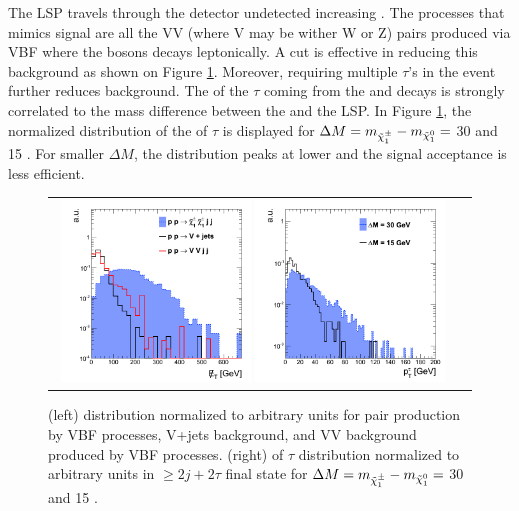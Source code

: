The \neutralinoone LSP travels through the detector undetected increasing \met. The processes that mimics signal are all the VV (where V may be wither W or Z) pairs produced via VBF where the bosons decays leptonically. A \met cut is eﬀective in reducing this background as shown on Figure \ref{fig:VBF_met_pttau}. Moreover, requiring multiple $\tau$’s in the event further reduces background. The \pt of the \ensuremath{\tau} coming from the \charginopm and \neutralinotwo decays is strongly correlated to the mass difference between the \charginopm and the \neutralinoone LSP. In Figure \ref{fig:VBF_met_pttau}, the normalized distribution of the \pt of \ensuremath{\tau} is displayed for \ensuremath{\Delta M = m_{\charginopm} - m_{\neutralinoone} =} 30 \gev and 15 \gev. For smaller \ensuremath{\Delta M}, the distribution peaks at lower \pt and the signal acceptance is less efficient.

\begin{figure}[tbh!]
	\centering
	\begin{tabular}{cc}
		\includegraphics[width=0.48\textwidth]{analysis/pics/VBFMet.png}
		\includegraphics[width=0.48\textwidth]{analysis/pics/Pheno_VBF_TauPt.png} 		
	\end{tabular}
	\caption{(left) \met distribution normalized to arbitrary units for \charginopm \charginopm pair production by VBF processes, V+jets background, and VV background produced by VBF processes. (right) \pt of \ensuremath{\tau} distribution normalized to arbitrary units in \ensuremath{\geq 2j + 2\tau} ﬁnal state for \ensuremath{\Delta M = m_{\charginopm} - m_{\neutralinoone} =} 30 \gev and 15 \gev.}
	\label{fig:VBF_met_pttau}
\end{figure}

